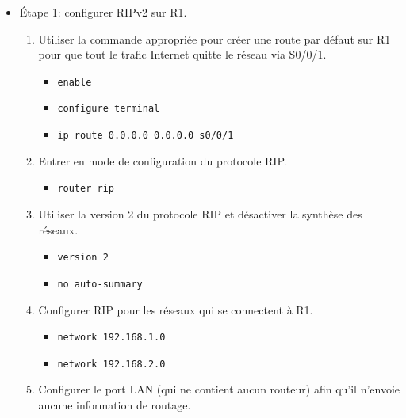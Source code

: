 \documentclass[a4paper]{article}
\begin{document}
\begin{itemize}





\item Étape 1: configurer RIPv2 sur R1.
\begin{enumerate}
    \item Utiliser la commande appropriée pour créer une route par défaut sur R1 pour que tout le trafic Internet quitte le réseau via S0/0/1.
    \begin{example}
        \begin{itemize}
            \item \texttt{enable}
            \item \texttt{configure terminal}
            \item \texttt{ip route 0.0.0.0 0.0.0.0 s0/0/1}
        \end{itemize}
    \end{example}
    \item Entrer en mode de configuration du protocole RIP.
    \begin{example}
        \begin{itemize}
            \item \texttt{router rip}
        \end{itemize}
    \end{example}
    \item Utiliser la version 2 du protocole RIP et désactiver la synthèse des réseaux.
    \begin{example}
        \begin{itemize}
            \item \texttt{version 2}
            \item \texttt{no auto-summary}
        \end{itemize}
    \end{example}
    \item Configurer RIP pour les réseaux qui se connectent à R1.
    \begin{example}
        \begin{itemize}
            \item \texttt{network 192.168.1.0}
            \item \texttt{network 192.168.2.0}
        \end{itemize}
    \end{example}
    \item Configurer le port LAN (qui ne contient aucun routeur) afin qu'il n'envoie aucune information de routage.

\end{enumerate}
\end{itemize}
\end{document}
